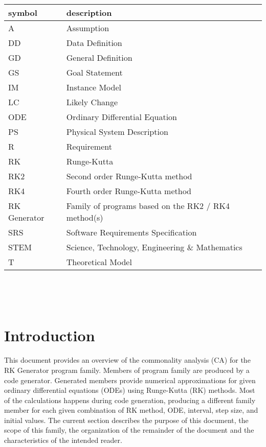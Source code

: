 \documentclass[12pt]{article}
\newcommand{\famname}{RK Generator} %
\begin{document}
\renewcommand{\arraystretch}{1.2}
\begin{tabular}{l l} 
  \toprule
  \textbf{symbol} & \textbf{description}\\
  \midrule 
  A & Assumption\\
  DD & Data Definition\\
  GD & General Definition\\
  GS & Goal Statement\\
  IM & Instance Model\\
  LC & Likely Change\\
  ODE & Ordinary Differential Equation\\
  PS & Physical System Description\\
  R & Requirement\\
  RK & Runge-Kutta\\
  RK2 & Second order Runge-Kutta method\\
  RK4 & Fourth order Runge-Kutta method\\
  \famname{} & Family of programs based on the RK2 / RK4 method(s)\\
  SRS & Software Requirements Specification\\
  STEM & Science, Technology, Engineering \& Mathematics\\
  T & Theoretical Model\\
  \bottomrule
\end{tabular}\\

\newpage

\tableofcontents

~\newpage


\section{Introduction}
This document provides an overview of the commonality analysis (CA) for the 
\famname{} program family. Members of program family are produced by a code 
generator. Generated members provide numerical approximations for given 
ordinary differential equations (ODEs) using Runge-Kutta (RK) methods. Most of 
the calculations happens during code generation, producing a different family 
member for each given combination of RK method, ODE, interval, step size, and 
initial values. 
The current section describes the purpose of this document, the scope of this 
family, the organization of the remainder of the document and the 
characteristics of the intended reader.
\end{document}
